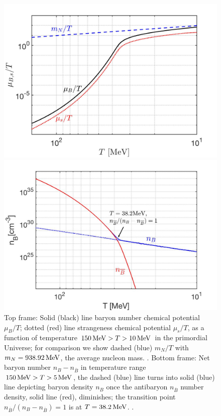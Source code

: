 \begin{figure}
\centerline{\includegraphics[width=0.82\linewidth]{./plots/New_Chemical_Potential_C.jpg}}
\vspace{-0.55cm}
\centerline{\includegraphics[width=0.84\linewidth]{./plots/Baryon_Antibaryon_cm.jpg}}
\caption{Top frame: Solid (black) line baryon number chemical potential $\mu_B/T$; dotted (red) line strangeness chemical potential $\mu_s/T$, as a function of temperature $150\text{\,MeV}> T>10\text{\,MeV}$ in the primordial Universe; for comparison we show dashed (blue) $m_N/T $ with $m_N=938.92\text{\,MeV}$, the average nucleon mass. . 
 
{\color{blue} Bottom frame: Net baryon number $n_{B}-n_{\overline{B}}$ in temperature range $150\text{\,MeV}>T>5\text{\,MeV}$, the dashed (blue) line turns into solid (blue) line depicting baryon density $n_{B}$ once the antibaryon $n_{\overline B}$ number density, solid line (red), diminishes; the transition point $n_{\overline B}/(n_B-n_{\overline B})=1$ is at $T=38.2\text{\,MeV}$. . }
}
\label{Baryon:fig}
\end{figure}

